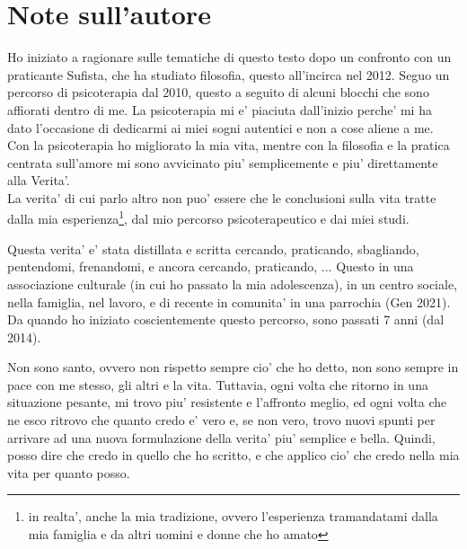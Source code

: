 
\chapter{Note sull'autore}

Ho iniziato a ragionare sulle tematiche di questo testo dopo un confronto con un praticante Sufista, che ha studiato filosofia, questo all'incirca nel 2012. Seguo un percorso di psicoterapia dal 2010, questo a seguito di alcuni blocchi che sono affiorati dentro di me. La psicoterapia mi e' piaciuta dall'inizio perche' mi ha dato l'occasione di dedicarmi ai miei sogni autentici e non a cose aliene a me. Con la psicoterapia ho migliorato la mia vita, mentre con la filosofia e la pratica centrata sull'amore mi sono avvicinato piu' semplicemente e piu' direttamente alla Verita'. \\

La verita' di cui parlo altro non puo' essere che le conclusioni sulla vita tratte dalla mia esperienza\footnote{in realta', anche la mia tradizione, ovvero l'esperienza tramandatami dalla mia famiglia e da altri uomini e donne che ho amato}, dal mio percorso psicoterapeutico e dai miei studi.

Questa verita' e' stata distillata e scritta cercando, praticando, sbagliando, pentendomi, frenandomi, e ancora cercando, praticando, ... Questo in una associazione culturale (in cui ho passato la mia adolescenza), in un centro sociale, nella famiglia, nel lavoro, e di recente in comunita' in una parrochia (Gen 2021). Da quando ho iniziato coscientemente questo percorso, sono passati 7 anni (dal 2014). 

Non sono santo, ovvero non rispetto sempre cio' che ho detto, non sono sempre in pace con me stesso, gli altri e la vita. Tuttavia, ogni volta che ritorno in una situazione pesante, mi trovo piu' resistente e l'affronto meglio, ed ogni volta che ne esco ritrovo che quanto credo e' vero e, se non vero, trovo nuovi spunti per arrivare ad una nuova formulazione della verita' piu' semplice e bella. Quindi, posso dire che credo in quello che ho scritto, e che applico cio' che credo nella mia vita per quanto posso.


